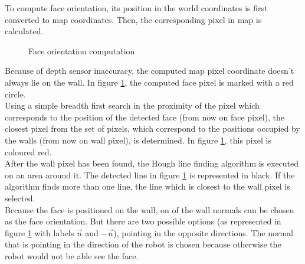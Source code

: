 \documentclass[12pt,a4paper]{article}
\begin{document}
	To compute face orientation, its position in the world coordinates is first converted to map coordinates. Then, the corresponding pixel in map is calculated. \\
	
	\begin{figure}[h]
		\centering
		\caption{Face orientation computation}
		\label{fig:orientation_computation}
	\end{figure}
	
	Because of depth sensor inaccuracy, the computed map pixel coordinate doesn't always lie on the wall. In figure \ref{fig:orientation_computation}, the computed face pixel is marked with a red circle. \\ 
	
	Using a simple breadth first search in the proximity of the pixel which corresponds to the position of the detected face (from now on face pixel), the closest pixel from the set of pixels, which correspond to the positions occupied by the walls (from now on wall pixel), is determined. In figure \ref{fig:orientation_computation}, this pixel is coloured red. \\
	
	After the wall pixel has been found, the Hough line finding algorithm is executed on an area around it. The detected line in figure \ref{fig:orientation_computation} is represented in black. If the algorithm finds more than one line, the line which is closest to the wall pixel is selected. \\
	
	Because the face is positioned on the wall, on of the wall normals can be chosen as the face orientation. But there are two possible options (as represented in figure \ref{fig:orientation_computation} with labels $\vec{n}$ and $-\vec{n}$), pointing in the opposite directions. The normal that is pointing in the direction of the robot is chosen because otherwise the robot would not be able see the face. \\
	
\end{document}
